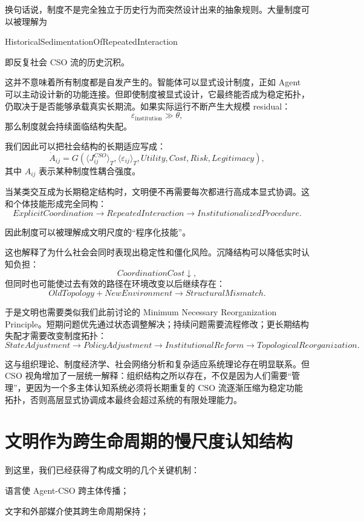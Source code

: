换句话说，制度不是完全独立于历史行为而突然设计出来的抽象规则。大量制度可以被理解为
\begin{statementbox}
HistoricalSedimentationOfRepeatedInteraction
\end{statementbox}
即反复社会 CSO 流的历史沉积。

这并不意味着所有制度都是自发产生的。智能体可以显式设计制度，正如 Agent 可以主动设计新的功能连接。但即使制度被显式设计，它最终能否成为稳定拓扑，仍取决于是否能够承载真实长期流。如果实际运行不断产生大规模 residual：
\[
\varepsilon_{\mathrm{institution}}\gg\theta,
\]
那么制度就会持续面临结构失配。

我们因此可以把社会结构的长期适应写成：
\[
\dot{A}_{ij}
=
G(
\langle J_{ij}^{CSO}\rangle_T,
\langle \varepsilon_{ij}\rangle_T,
Utility,
Cost,
Risk,
Legitimacy
),
\]
其中 $A_{ij}$ 表示某种制度性耦合强度。

当某类交互成为长期稳定结构时，文明便不再需要每次都进行高成本显式协调。这和个体技能形成完全同构：
\[
ExplicitCoordination
\rightarrow
RepeatedInteraction
\rightarrow
InstitutionalizedProcedure.
\]

因此制度可以被理解成文明尺度的“程序化技能”。

这也解释了为什么社会会同时表现出稳定性和僵化风险。沉降结构可以降低实时认知负担：
\[
CoordinationCost\downarrow,
\]
但同时也可能使过去有效的路径在环境改变以后继续存在：
\[
OldTopology
+
NewEnvironment
\rightarrow
StructuralMismatch.
\]

于是文明也需要类似我们此前讨论的 Minimum Necessary Reorganization Principle。短期问题优先通过状态调整解决；持续问题需要流程修改；更长期结构失配才需要改变制度拓扑：
\[
StateAdjustment
\rightarrow
PolicyAdjustment
\rightarrow
InstitutionalReform
\rightarrow
TopologicalReorganization.
\]

这与组织理论、制度经济学、社会网络分析和复杂适应系统理论存在明显联系。但 CSO 视角增加了一层统一解释：组织结构之所以存在，不仅是因为人们需要“管理”，更因为一个多主体认知系统必须将长期重复的 CSO 流逐渐压缩为稳定功能拓扑，否则高层显式协调成本最终会超过系统的有限处理能力。


\section{文明作为跨生命周期的慢尺度认知结构}

到这里，我们已经获得了构成文明的几个关键机制：

语言使 Agent-CSO 跨主体传播；

文字和外部媒介使其跨生命周期保持；

